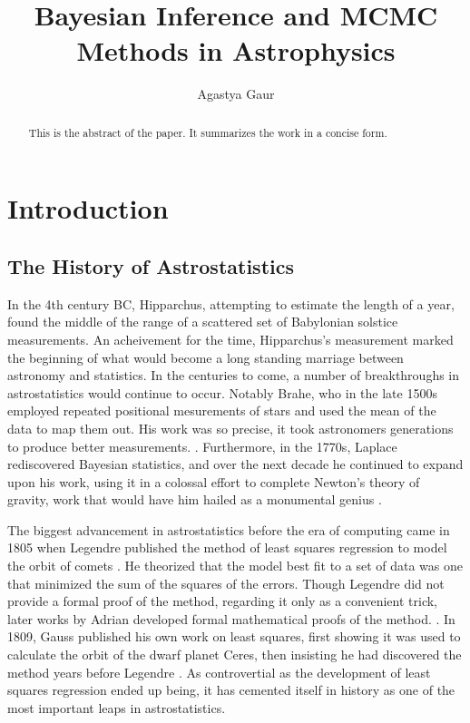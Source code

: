\documentclass[preprint2,linenumbers,longauthor]{aastex631}
\begin{document}
\label{placeholder} %

\title{Bayesian Inference and MCMC Methods in Astrophysics}
\author{Agastya Gaur}

\begin{abstract}
  This is the abstract of the paper. It summarizes the work in a concise form.
\end{abstract}

\tableofcontents

\section{Introduction}
\label{sec:Introduction}
\subsection{The History of Astrostatistics}
In the 4th century BC, Hipparchus, attempting to estimate the length of a year, found the middle of the range of a scattered set of Babylonian solstice measurements. An acheivement for the time, Hipparchus's measurement marked the beginning of what would become a long standing marriage between astronomy and statistics. In the centuries to come, a number of breakthroughs in astrostatistics would continue to occur. Notably Brahe, who in the late 1500s employed repeated positional mesurements of stars and used the mean of the data to map them out. His work was so precise, it took astronomers generations to produce better measurements. \citep{leavesleyTychoBrahesWay2018}. Furthermore, in the 1770s, Laplace rediscovered Bayesian statistics, and over the next decade he continued to expand upon his work, using it in a colossal effort to complete Newton's theory of gravity, work that would have him hailed as a monumental genius \citep{stiglerStudiesHistoryProbability1975}.

The biggest advancement in astrostatistics before the era of computing came in 1805 when Legendre published the method of least squares regression to model the orbit of comets \citep{feigelsonStatisticalChallengesModern2004}. He theorized that the model best fit to a set of data was one that minimized the sum of the squares of the errors. Though Legendre did not provide a formal proof of the method, regarding it only as a convenient trick, later works by Adrian developed formal mathematical proofs of the method. \citep{merrimanHistoryMethodLeast1877}. In 1809, Gauss published his own work on least squares, first showing it was used to calculate the orbit of the dwarf planet Ceres, then insisting he had discovered the method years before Legendre \citep{stiglerGaussInventionLeast1981}. As controvertial as the development of least squares regression ended up being, it has cemented itself in history as one of the most important leaps in astrostatistics.
\end{document}
